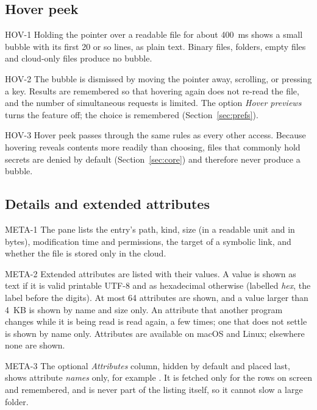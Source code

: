 \subsection{Hover peek}

\begin{req}{HOV-1}
Holding the pointer over a readable file for about 400~ms shows a small bubble with
its first 20 or so lines, as plain text.  Binary files, folders, empty files and
cloud-only files produce no bubble.
\end{req}

\begin{req}{HOV-2}
The bubble is dismissed by moving the pointer away, scrolling, or pressing a key.
Results are remembered so that hovering again does not re-read the file, and the
number of simultaneous requests is limited.  The option \emph{Hover previews} turns
the feature off; the choice is remembered (Section~\ref{sec:prefs}).
\end{req}

\begin{req}{HOV-3}
Hover peek passes through the same rules as every other access.  Because hovering
reveals contents more readily than choosing, files that commonly hold secrets are
denied by default (Section~\ref{sec:core}) and therefore never produce a bubble.
\end{req}

\subsection{Details and extended attributes}

\begin{req}{META-1}
The pane lists the entry's path, kind, size (in a readable unit and in bytes),
modification time and permissions, the target of a symbolic link, and whether the
file is stored only in the cloud.
\end{req}

\begin{req}{META-2}
Extended attributes are listed with their values.  A value is shown as text if it is
valid printable UTF-8 and as hexadecimal otherwise (labelled \emph{hex}, the label
before the digits).  At most 64 attributes are shown, and a value larger than
4~KB is shown by name and size only.  An attribute that another program changes
while it is being read is read again, a few times; one that does not settle is shown
by name only.  Attributes are available on macOS and Linux; elsewhere none are shown.
\end{req}

\begin{req}{META-3}
The optional \emph{Attributes} column, hidden by default and placed last, shows
attribute \emph{names} only, for example .  It is fetched
only for the rows on screen and remembered, and is never part of the listing itself,
so it cannot slow a large folder.
\end{req}
